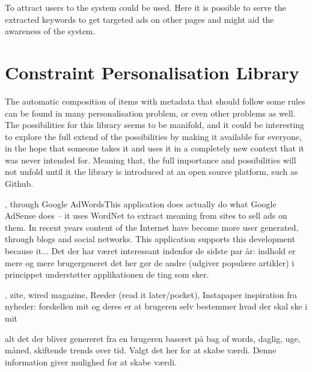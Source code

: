 To attract users to the system \cite{AdWords} could be used. Here it is possible to serve the extracted keywords to get targeted ads on other pages and might aid the awareness of the system.

\section{Constraint Personalisation Library}
The automatic composition of items with metadata that should follow some rules can be found in many personalisation problem, or even other problems as well. The possibilities for this library seems to be manifold, and it could be interesting to explore the full extend of the possibilities by making it available for everyone, in the hope that someone takes it and uses it in a completely new context that it was never intended for. Meaning that, the full importance and possibilities will not unfold until it the library is introduced at an open source platform, such as Github.







, through Google AdWordsThis application does actually do what Google AdSense does -- it uses WordNet to extract meaning from sites to sell ads on them.
In recent years content of the Internet have become more user generated, through blogs and social networks. This application supports this development because it...
Det der har været interessant indenfor de sidste par år:
indhold er mere og mere brugergeneret
det her gør de andre (udgiver populære artikler)
i princippet understøtter applikationen de ting som sker.



, zite, wired magazine, Reeder (read it later/pocket), Instapaper
inspiration fra nyheder: forskellen mit og deres er at brugeren selv bestemmer hvad der skal ske i mit

alt det der bliver genereret fra en brugeren baseret på bag of words, daglig, uge, måned, skiftende trends over tid. Valgt det her for at skabe værdi. Denne information giver mulighed for at skabe værdi.

